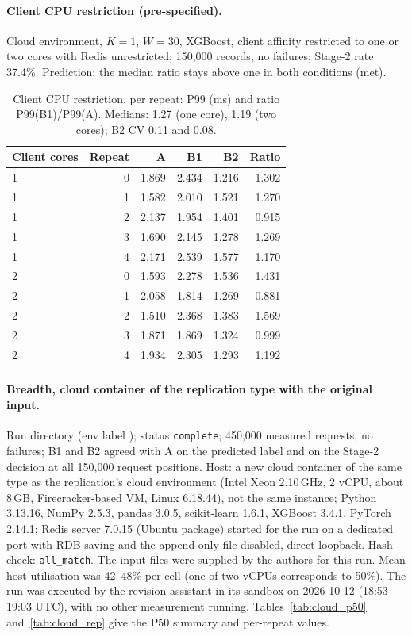 \documentclass[10pt,a4paper]{article}
\begin{document}
\paragraph{Client CPU restriction (pre-specified).} Cloud environment, $K=1$, $W=30$, XGBoost, client affinity restricted to one or two cores with Redis unrestricted; 150,000 records, no failures; Stage-2 rate 37.4\%. Prediction: the median ratio stays above one in both conditions (met).

\begin{table}[h]
\centering\small
\caption{Client CPU restriction, per repeat: P99 (ms) and ratio P99(B1)/P99(A). Medians: 1.27 (one core), 1.19 (two cores); B2 CV 0.11 and 0.08.}\label{tab:rc}
\begin{tabular}{lrrrrr}
\toprule
Client cores & Repeat & A & B1 & B2 & Ratio \\
\midrule
1 & 0 & 1.869 & 2.434 & 1.216 & 1.302 \\
1 & 1 & 1.582 & 2.010 & 1.521 & 1.270 \\
1 & 2 & 2.137 & 1.954 & 1.401 & 0.915 \\
1 & 3 & 1.690 & 2.145 & 1.278 & 1.269 \\
1 & 4 & 2.171 & 2.539 & 1.577 & 1.170 \\
2 & 0 & 1.593 & 2.278 & 1.536 & 1.431 \\
2 & 1 & 2.058 & 1.814 & 1.269 & 0.881 \\
2 & 2 & 1.510 & 2.368 & 1.383 & 1.569 \\
2 & 3 & 1.871 & 1.869 & 1.324 & 0.999 \\
2 & 4 & 1.934 & 2.305 & 1.293 & 1.192 \\
\bottomrule
\end{tabular}
\end{table}

\paragraph{Breadth, cloud container of the replication type with the original input.} Run directory  (env label ); status \texttt{complete}; 450,000 measured requests, no failures; B1 and B2 agreed with A on the predicted label and on the Stage-2 decision at all 150,000 request positions. Host: a new cloud container of the same type as the replication's cloud environment (Intel Xeon 2.10\,GHz, 2 vCPU, about 8\,GB, Firecracker-based VM, Linux 6.18.44), not the same instance; Python 3.13.16, NumPy 2.5.3, pandas 3.0.5, scikit-learn 1.6.1, XGBoost 3.4.1, PyTorch 2.14.1; Redis server 7.0.15 (Ubuntu package) started for the run on a dedicated port with RDB saving and the append-only file disabled, direct loopback. Hash check: \texttt{all\_match}. The input files were supplied by the authors for this run. Mean host utilisation was 42--48\% per cell (one of two vCPUs corresponds to 50\%). The run was executed by the revision assistant in its sandbox on 2026-10-12 (18:53--19:03 UTC), with no other measurement running. Tables~\ref{tab:cloud_p50} and~\ref{tab:cloud_rep} give the P50 summary and per-repeat values.
\end{document}
